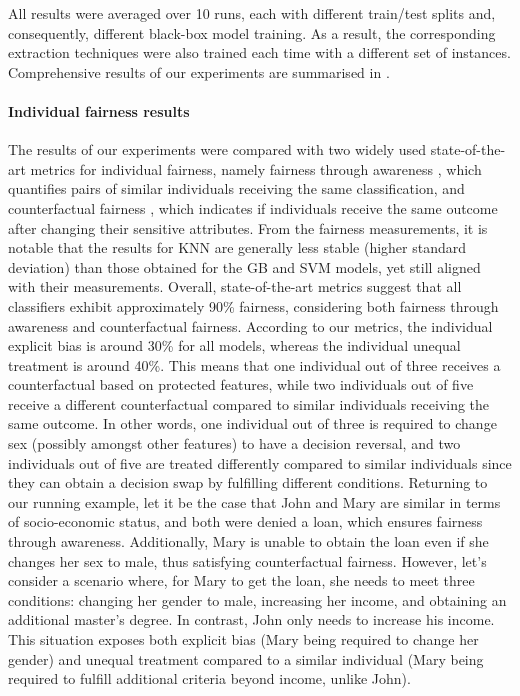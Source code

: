 \documentclass[letterpaper]{article} %
\begin{document}
All results were averaged over 10 runs, each with different train/test splits and, consequently, different black-box model training.
%
As a result, the corresponding extraction techniques were also trained each time with a different set of instances.
%
Comprehensive results of our experiments are summarised in .

\paragraph{Individual fairness results}
The results of our experiments were compared with two widely used state-of-the-art metrics for individual fairness, namely fairness through awareness \cite{10.1145/2090236.2090255}, which quantifies pairs of similar individuals receiving the same classification, and counterfactual fairness \cite{NIPS2017_a486cd07}, which indicates if individuals receive the same outcome after changing their sensitive attributes.
%
From the fairness measurements, it is notable that the results for KNN are generally less stable (higher standard deviation) than those obtained for the GB and SVM models, yet still aligned with their measurements.
%
Overall, state-of-the-art metrics suggest that all classifiers exhibit approximately 90\% fairness, considering both fairness through awareness and counterfactual fairness.
%
According to our metrics, the individual explicit bias is around 30\% for all models, whereas the individual unequal treatment is around 40\%.
%
This means that one individual out of three receives a counterfactual based on protected features, while two individuals out of five receive a different counterfactual compared to similar individuals receiving the same outcome.
%
In other words, one individual out of three is required to change sex (possibly amongst other features) to have a decision reversal, and two individuals out of five are treated differently compared to similar individuals since they can obtain a decision swap by fulfilling different conditions.
%
Returning to our running example, let it be the case that John and Mary are similar in terms of socio-economic status, and both were denied a loan, which ensures fairness through awareness. Additionally, Mary is unable to obtain the loan even if she changes her sex to male, thus satisfying counterfactual fairness. 
%
However, let's consider a scenario where, for Mary to get the loan, she needs to meet three conditions: changing her gender to male, increasing her income, and obtaining an additional master’s degree. In contrast, John only needs to increase his income. 
%
This situation exposes both explicit bias (Mary being required to change her gender) and unequal treatment compared to a similar individual (Mary being required to fulfill additional criteria beyond income, unlike John).
\end{document}
